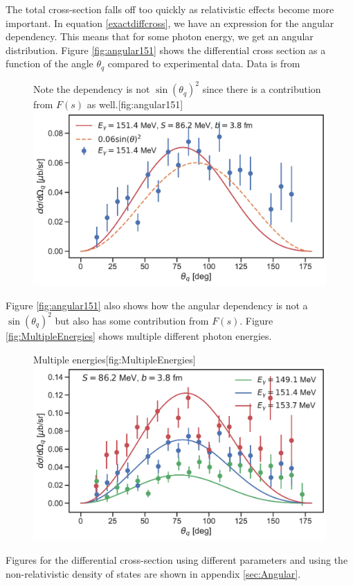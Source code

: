 The total cross-section falls off too quickly as relativistic effects become more important. In equation \eqref{exactdiffcross}, we have an expression for the angular dependency. This means that for some photon energy, we get an angular distribution. Figure \ref{fig:angular151} shows the differential cross section as a function of the angle $\theta_q$ compared to experimental data. Data is from \cite{BeckPion}  
\begin{figure}[H]
	\begin{sidecaption}{Note the dependency is not $\sin(\theta_q)^2$ since there is a contribution from $F(s)$ as well.}[fig:angular151]
		\includegraphics[width=\linewidth]{Figures/DiffCross151_rel.pdf}
	\end{sidecaption}
\end{figure}
Figure \ref{fig:angular151} also shows how the angular dependency is not a $\sin(\theta_q)^2$ but also has some contribution from $F(s)$. Figure \ref{fig:MultipleEnergies} shows multiple different photon energies.
\begin{figure}[H]
	\begin{sidecaption}{Multiple energies}[fig:MultipleEnergies]
		\includegraphics[width=\linewidth]{Figures/MultiDiffcross_rel.pdf}
	\end{sidecaption}
\end{figure}
Figures for the differential cross-section using different parameters and using the non-relativistic density of states are shown in appendix \ref{sec:Angular}.

